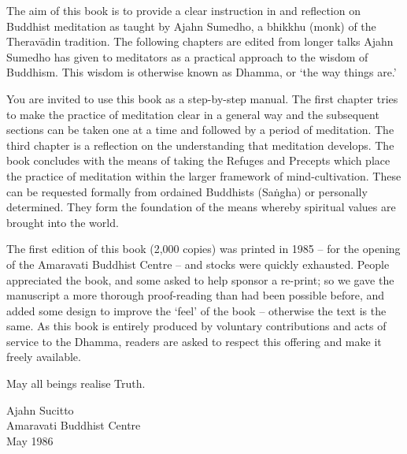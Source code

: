
The aim of this book is to provide a clear instruction in and reflection on Buddhist meditation as taught by Ajahn Sumedho, a bhikkhu (monk) of the Therav\=adin tradition. The following chapters are edited from longer talks Ajahn Sumedho has given to meditators as a practical approach to the wisdom of Buddhism. This wisdom is otherwise known as Dhamma, or `the way things are.'

You are invited to use this book as a step-by-step manual. The first chapter tries to make the practice of meditation clear in a general way and the subsequent sections can be taken one at a time and followed by a period of meditation. The third chapter is a reflection on the understanding that meditation develops. The book concludes with the means of taking the Refuges and Precepts which place the practice of meditation within the larger framework of mind-cultivation. These can be requested formally from ordained Buddhists (Sa\.ngha) or personally determined. They form the foundation of the means whereby spiritual values are brought into the world.

The first edition of this book (2,000 copies) was printed in 1985 -- for the opening of the Amaravati Buddhist Centre -- and stocks were quickly exhausted. People appreciated the book, and some asked to help sponsor a re-print; so we gave the manuscript a more thorough proof-reading than had been possible before, and added some design to improve the `feel' of the book -- otherwise the text is the same. As this book is entirely produced by voluntary contributions and acts of service to the Dhamma, readers are asked to respect this offering and make it freely available.

May all beings realise Truth.

\bigskip
{\par\raggedleft
Ajahn Sucitto\\
Amaravati Buddhist Centre\\
May 1986
\par}

